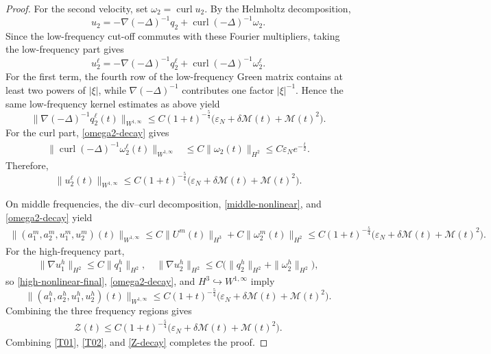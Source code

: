 \documentclass[10pt,reqno]{amsart}
\numberwithin{equation}{section}
\begin{document}
\begin{proof}
For the second velocity, set $\omega_2=\operatorname{curl}u_2$. By the Helmholtz decomposition,
\[
u_2=-\nabla(-\Delta)^{-1}q_2
+\operatorname{curl}(-\Delta)^{-1}\omega_2.
\]
Since the low-frequency cut-off commutes with these Fourier multipliers,
taking the low-frequency part gives
\[
u_2^\ell=-\nabla(-\Delta)^{-1}q_2^\ell
+\operatorname{curl}(-\Delta)^{-1}\omega_2^\ell.
\]
For the first term, the fourth row of the low-frequency Green matrix
contains at least two powers of $|\xi|$, while
$\nabla(-\Delta)^{-1}$ contributes one factor $|\xi|^{-1}$.
Hence the same low-frequency kernel estimates as above yield
\[
\|\nabla(-\Delta)^{-1}q_2^\ell(t)\|_{W^{1,\infty}}
\le C(1+t)^{-\frac54}
\big(\varepsilon_N+\delta\mathcal M(t)+\mathcal M(t)^2\big).
\]
For the curl part, \eqref{omega2-decay} gives
\begin{align*}
\|\operatorname{curl}(-\Delta)^{-1}\omega_2^\ell(t)\|_{W^{1,\infty}}
&\le C\|\omega_2(t)\|_{H^2}
\le C\varepsilon_Ne^{-\frac{t}{2}}.
\end{align*}
Therefore,
\[%
\|u_2^\ell(t)\|_{W^{1,\infty}}
\le C(1+t)^{-\frac54}
\big(\varepsilon_N+\delta\mathcal M(t)+\mathcal M(t)^2\big).
\]%

On middle frequencies, the div--curl decomposition, \eqref{middle-nonlinear}, and
\eqref{omega2-decay} yield
\begin{align*}
 \|(a_1^m,a_2^m,u_1^m,u_2^m)(t)\|_{W^{1,\infty}}  \le C\|U^m(t)\|_{H^3}+C\|\omega_2^m(t)\|_{H^2} \le C(1+t)^{-\frac54}
\big(\varepsilon_N+\delta\mathcal M(t)+\mathcal M(t)^2\big).
\end{align*}
For the high-frequency part,
\begin{align*}
\|\nabla u_1^h\|_{H^2}\le C\|q_1^h\|_{H^2},\quad
\|\nabla u_2^h\|_{H^2}\le C\big(\|q_2^h\|_{H^2}+\|\omega_2^h\|_{H^2}\big),
\end{align*}
so \eqref{high-nonlinear-final}, \eqref{omega2-decay}, and
$H^3\hookrightarrow W^{1,\infty}$ imply
\[%
\|(a_1^h,a_2^h,u_1^h,u_2^h)(t)\|_{W^{1,\infty}}
\le C(1+t)^{-\frac54}
\big(\varepsilon_N+\delta\mathcal M(t)+\mathcal M(t)^2\big).
\]%
Combining the three frequency regions gives
\begin{align}\label{Z-decay}
\mathcal Z(t)
\le C(1+t)^{-\frac54}
\big(\varepsilon_N+\delta\mathcal M(t)+\mathcal M(t)^2\big).
\end{align}
Combining \eqref{T01}, \eqref{T02}, and \eqref{Z-decay} completes the proof.
\end{proof}
\end{document}
